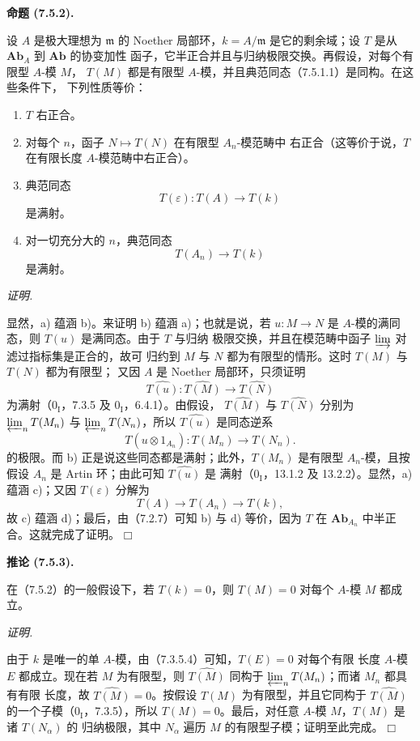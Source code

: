 \documentclass[UTF8,fontset=none,11pt,oneside,openany]{ctexbook}
\providecommand{\square}{\mdlgwhtsquare}
\newenvironment{proposition}[1][]{%
  \par\medskip\noindent\textbf{命题 (#1).}\ %
}{\par}
\newenvironment{corollary}[1][]{%
  \par\medskip\noindent\textbf{推论 (#1).}\ %
}{\par}
\newenvironment{proof}{%
  \par\smallskip\noindent\textit{证明.}\ %
}{\hfill$\square$\par}
\newcommand{\oldpage}[2][]{%
  \hypertarget{ega-source-page-#1-#2}{}%
  \marginnote{\scriptsize\textbf{#1}~|~#2}\ignorespaces}
\begin{document}
\begin{proposition}[7.5.2]
设 $A$ 是极大理想为 $\mathfrak m$ 的 Noether 局部环，$k=A/\mathfrak m$
是它的剩余域；设 $T$ 是从 $\mathbf{Ab}_A$ 到 $\mathbf{Ab}$ 的协变加性
函子，它半正合并且与归纳极限交换。再假设，对每个有限型 $A$-模 $M$，
$T(M)$ 都是有限型 $A$-模，并且典范同态（7.5.1.1）是同构。在这些条件下，
下列性质等价：
\begin{enumerate}
  \item[a)] $T$ 右正合。
  \item[b)] 对每个 $n$，函子 $N\mapsto T(N)$ 在有限型 $A_n$-模范畴中
    右正合（这等价于说，$T$ 在有限长度 $A$-模范畴中右正合）。
  \item[c)] 典范同态
    \[
      T(\varepsilon):T(A)\longrightarrow T(k)
    \]
    是满射。
  \item[d)] 对一切充分大的 $n$，典范同态
    \[
      T(A_n)\longrightarrow T(k)
    \]
    是满射。
\end{enumerate}
\end{proposition}

\begin{proof}
显然，a) 蕴涵 b)。来证明 b) 蕴涵 a)；也就是说，若
$u:M\to N$ 是 $A$-模的满同态，则 $T(u)$ 是满同态。由于 $T$ 与归纳
极限交换，并且在模范畴中函子 $\varinjlim$ 对滤过指标集是正合的，故可
归约到 $M$ 与 $N$ 都为有限型的情形。这时 $T(M)$ 与 $T(N)$ 都为有限型；
又因 $A$ 是 Noether 局部环，只须证明
\[
  \widehat{T(u)}:
  \widehat{T(M)}
  \longrightarrow
  \widehat{T(N)}
\]
为满射（$0_{\mathrm I}$，7.3.5 及 $0_{\mathrm I}$，6.4.1）。由假设，
$\widehat{T(M)}$ 与 $\widehat{T(N)}$ 分别为 $\varprojlim_n T(M_n)$ 与
$\varprojlim_n T(N_n)$，所以 $\widehat{T(u)}$ 是同态逆系
\[
  T(u\otimes1_{A_n}):T(M_n)\longrightarrow T(N_n).
\]
的极限。而 b) 正是说这些同态都是满射；此外，$T(M_n)$ 是有限型
$A_n$-模，且按假设 $A_n$ 是 Artin 环；由此可知 $\widehat{T(u)}$ 是
满射（$0_{\mathrm I}$，13.1.2 及 13.2.2）。显然，a) 蕴涵 c)；又因
$T(\varepsilon)$ 分解为
\[
  T(A)\longrightarrow T(A_n)\longrightarrow T(k),
\]
故 c) 蕴涵 d)；最后，由（7.2.7）可知 b) 与 d) 等价，因为 $T$
在 $\mathbf{Ab}_{A_n}$ 中半正合。这就完成了证明。
\end{proof}

\begin{corollary}[7.5.3]
在（7.5.2）的一般假设下，若 $T(k)=0$，则 $T(M)=0$ 对每个 $A$-模
$M$ 都成立。
\end{corollary}

\begin{proof}
\oldpage[III]{191}
由于 $k$ 是唯一的单 $A$-模，由（7.3.5.4）可知，$T(E)=0$ 对每个有限
长度 $A$-模 $E$ 都成立。现在若 $M$ 为有限型，则
$\widehat{T(M)}$ 同构于 $\varprojlim_n T(M_n)$；而诸 $M_n$ 都具有有限
长度，故 $\widehat{T(M)}=0$。按假设 $T(M)$ 为有限型，并且它同构于
$\widehat{T(M)}$ 的一个子模（$0_{\mathrm I}$，7.3.5），所以
$T(M)=0$。最后，对任意 $A$-模 $M$，$T(M)$ 是诸 $T(N_\alpha)$ 的
归纳极限，其中 $N_\alpha$ 遍历 $M$ 的有限型子模；证明至此完成。
\end{proof}
\end{document}
